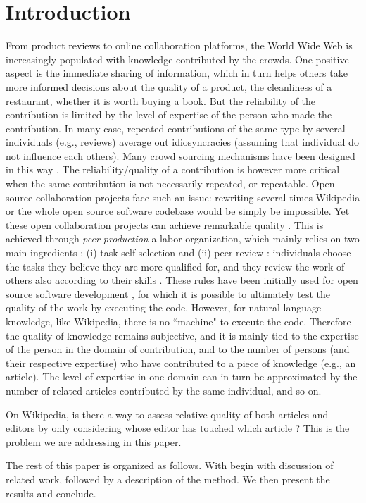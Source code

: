 \section{Introduction}
From product reviews to online collaboration platforms, the World Wide Web is increasingly populated with knowledge contributed by the crowds. One positive aspect is the immediate sharing of information, which in turn helps others take more informed decisions about the quality of a product, the cleanliness of a restaurant, whether it is worth buying a book. But the reliability of the contribution is limited by the level of expertise of the person who made the contribution. In many case, repeated contributions of the same type by several individuals (e.g., reviews) average out idiosyncracies (assuming that individual do not influence each others). Many crowd sourcing mechanisms have been designed in this way \cite{}. The reliability/quality of a contribution is however more critical  when the same contribution is not necessarily repeated, or repeatable. Open source collaboration projects face such an issue: rewriting several times Wikipedia or the whole open source software codebase would be simply be impossible. Yet these open collaboration projects can achieve remarkable quality \cite{nature paper}. This is achieved through {\it peer-production} a labor organization, which mainly relies on two main ingredients : (i) task self-selection and (ii) peer-review : individuals choose the tasks they believe they are more qualified for, and they review the work of others also according to their skills \cite{benkler2002}. These rules have been initially used for open source software development \cite{raymond1999}, for which it is possible to ultimately test the quality of the work by executing the code. However, for natural language knowledge, like  Wikipedia, there is no ``machine" to execute the code. Therefore the quality of knowledge remains subjective, and it is mainly tied to the expertise of the person in the domain of contribution, and to the number of persons (and their respective expertise) who have contributed to a piece of knowledge (e.g., an article). The level of expertise in one domain can in turn be approximated by the number of related articles contributed by the same individual, and so on. 

On Wikipedia, is there a way to assess relative quality of both articles and editors by only considering whose editor has touched which article ? This is the problem we are addressing in this paper. 

The rest of this paper is organized as follows. With begin with discussion of related work, followed by a description of the method. We then present the results and conclude. 
